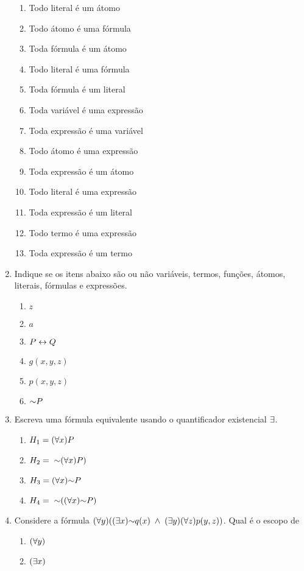 \begin{enumerate}
\begin{enumerate}
      \item Todo literal é um átomo
      \item Todo átomo é uma fórmula
      \item Toda fórmula é um átomo 
      \item Todo literal é uma fórmula
      \item Toda fórmula é um literal 
      \item Toda variável é uma expressão
      \item Toda expressão é uma variável
      \item Todo átomo é uma expressão
      \item Toda expressão é um átomo
      \item Todo literal é uma expressão
      \item Toda expressão é um literal
      \item Todo termo é uma expressão
      \item Toda expressão é um termo
    \end{enumerate}
  \item Indique se os itens abaixo são ou não variáveis, termos, funções, átomos, literais, fórmulas e expressões.
    \begin{enumerate}
      \item $z$
      \item $a$
      \item $P \leftrightarrow Q$
      \item $g(x, y, z)$
      \item $p(x, y, z)$
      \item $\mathord{\sim} P$        
    \end{enumerate}
  \item Escreva uma fórmula equivalente usando o quantificador existencial $\exists$.
    \begin{enumerate}
      \item $H_1 = (\forall x) P$
      \item $H_2 = \;\mathord{\sim} (\forall x) P)$
      \item $H_3 = (\forall x) \mathord{\sim} P$
      \item $H_4 = \;\mathord{\sim}((\forall x) \mathord{\sim} P)$
    \end{enumerate}
  \item Considere a fórmula $(\forall y) ( (\exists x) \mathord{\sim} q(x) \;\land\; (\exists y) (\forall z) p(y, z) )$. Qual é o escopo de
    \begin{enumerate}
      \item $(\forall y)$
      \item $(\exists x)$

\end{enumerate}
\end{enumerate}
